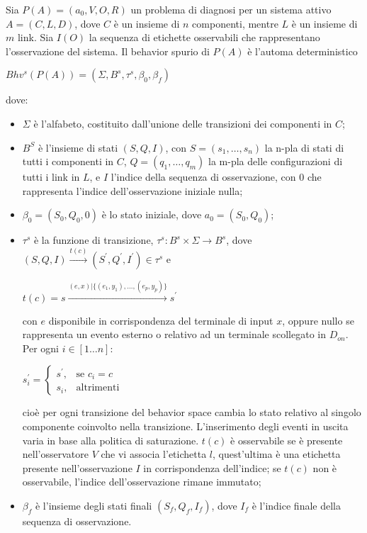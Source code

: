 \begin{defn}
Sia $P(A) = (a_0,V,O,R)$ un problema di diagnosi per un sistema attivo $A = (C,L,D)$, dove $C$ è un insieme di $n$ componenti, mentre $L$ è un insieme di $m$ link. Sia $I(O)$ la sequenza di etichette osservabili che rappresentano l'osservazione del sistema. Il behavior spurio di $P(A)$ è l'automa deterministico
\begin{center}
	$Bhv^s(P(A)) = (\Sigma,B^s,\tau^s,\beta_0,\beta_f)$
\end{center}
dove:
\begin{itemize}
\item $\Sigma$ è l'alfabeto, costituito dall'unione delle transizioni dei componenti in $C$;
\item $B^S$ è l'insieme di stati $(S,Q,I)$, con $S = (s_1,\ldots,s_n)$ la n-pla di stati di tutti i componenti in $C$, $Q = (q_1,\ldots,q_m)$ la m-pla delle configurazioni di tutti i link in $L$, e $I$ l'indice della sequenza di osservazione, con $0$ che rappresenta l'indice dell'osservazione iniziale nulla;
\item $\beta_0 = (S_0,Q_0,0)$ è lo stato iniziale, dove $a_0 = (S_0,Q_0)$;
\item $\tau^s$ è la funzione di transizione, $\tau^s: B^s \times \Sigma \rightarrow B^s$, dove $(S,Q,I) \xrightarrow{t(c)} (S^\prime,Q^\prime,I^\prime) \in \tau^s$ e 
\begin{center}
	$t(c) = s \xrightarrow{(e,x) | \{(e_1,y_1), \ldots, (e_p,y_p)\}} s^\prime$
\end{center}
con $e$ disponibile in corrispondenza del terminale di input $x$, oppure nullo se rappresenta un evento esterno o relativo ad un terminale scollegato in $D_{on}$.
Per ogni $i \in [1 \ldots n]$:
\begin{center}
$s^\prime_i = \begin{cases} s^\prime, & \mbox{se }c_i = c\\ s_i, & \mbox{altrimenti} \end{cases}$
\end{center}
cioè per ogni transizione del behavior space cambia lo stato relativo al singolo componente coinvolto nella transizione.
L'inserimento degli eventi in uscita varia in base alla politica di saturazione.
$t(c)$ è osservabile se è presente nell'osservatore $V$ che vi associa l'etichetta $l$, quest'ultima è una etichetta presente nell'osservazione $I$ in corrispondenza dell'indice; se $t(c)$ non è osservabile, l'indice dell'osservazione rimane immutato;
\item $\beta_f$ è l'insieme degli stati finali $(S_f,Q_f,I_f)$, dove $I_f$ è l'indice finale della sequenza di osservazione.
\end{itemize}
\end{defn}
